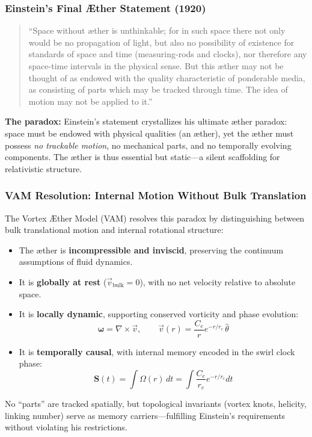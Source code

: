 
\vspace{1em}
\subsubsection*{Einstein’s Final Æther Statement (1920)}
\begin{quote}
\small
“Space without æther is unthinkable; for in such space there not only would be no propagation of light, but also no possibility of existence for standards of space and time (measuring-rods and clocks), nor therefore any space-time intervals in the physical sense. But this æther may not be thought of as endowed with the quality characteristic of ponderable media, as consisting of parts which may be tracked through time. The idea of motion may not be applied to it.”
\end{quote}

\noindent\textbf{The paradox:}  Einstein’s statement crystallizes his ultimate æther paradox: space must be endowed with physical qualities (an æther), yet the æther must possess \emph{no trackable motion}, no mechanical parts, and no temporally evolving components. The æther is thus essential but static—a silent scaffolding for relativistic structure.

\medskip

\subsubsection*{VAM Resolution: Internal Motion Without Bulk Translation}
The Vortex Æther Model (VAM) resolves this paradox by distinguishing between bulk translational motion and internal rotational structure:

\begin{itemize}
    \item The æther is \textbf{incompressible and inviscid}, preserving the continuum assumptions of fluid dynamics.
    \item It is \textbf{globally at rest} (\( \vec{v}_{\text{bulk}} = 0 \)), with no net velocity relative to absolute space.
    \item It is \textbf{locally dynamic}, supporting conserved vorticity and phase evolution:
    \[
        \boldsymbol{\omega} = \nabla \times \vec{v}, \qquad
        \vec{v}(r) = \frac{C_e}{r} e^{-r/r_c} \, \hat{\theta}
    \]
    \item It is \textbf{temporally causal}, with internal memory encoded in the swirl clock phase:
    \[
        \boldsymbol{S}(t) = \int \Omega(r) \, dt = \int \frac{C_e}{r_c} e^{-r/r_c} dt
    \]
\end{itemize}
No “parts” are tracked spatially, but topological invariants (vortex knots, helicity, linking number) serve as memory carriers—fulfilling Einstein’s requirements without violating his restrictions.


